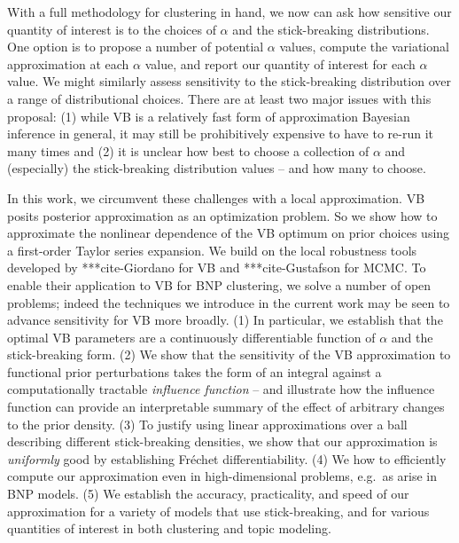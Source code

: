 With a full methodology for clustering in hand, we now can ask how sensitive our quantity of interest is to the choices of $\alpha$ and the stick-breaking distributions. One option is to propose a number of potential $\alpha$ values, compute the variational approximation at each $\alpha$ value, and report our quantity of interest for each $\alpha$ value. We might similarly assess sensitivity to the stick-breaking distribution over a range of distributional choices. There are at least two major issues with this proposal: (1) while VB is a relatively fast form of approximation Bayesian inference in general, it may still be prohibitively expensive to have to re-run it many times and (2) it is unclear how best to choose a collection of $\alpha$ and (especially) the stick-breaking distribution values -- and how many to choose.

In this work, we circumvent these challenges with a local approximation. VB posits posterior approximation as an optimization problem. So we show how to approximate the nonlinear dependence of the VB optimum on prior choices using a
first-order Taylor series expansion. We build on the local robustness tools developed by ***cite-Giordano for VB and ***cite-Gustafson for MCMC. To enable their application to VB for BNP clustering, we solve a number of open problems; indeed the techniques we introduce in the current work may be seen to advance sensitivity for VB more broadly. (1) In particular, we establish that the optimal VB parameters are a continuously differentiable function of $\alpha$ and the stick-breaking form. (2) We show that the sensitivity
of the VB approximation to functional prior perturbations takes the form of
an integral against a computationally tractable \textit{influence function} -- and illustrate how the influence function can provide an interpretable summary of the effect of arbitrary changes to
the prior density. (3) To justify using linear approximations over a ball describing different stick-breaking densities, we show that our approximation is \textit{uniformly} good by establishing Fr\'echet differentiability. (4) We how to efficiently
compute our approximation even in high-dimensional problems, e.g.\ as arise in BNP models. (5) We establish the accuracy, practicality, and speed of our approximation for a variety of models that use stick-breaking, and for various quantities of interest in both clustering and topic modeling.
